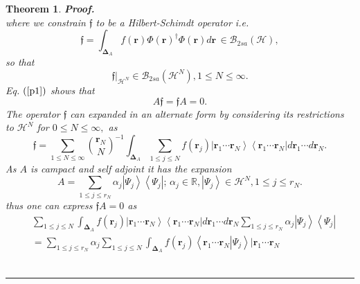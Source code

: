 \documentclass[aps,preprint]{revtex4}%
\newtheorem{theorem}{Theorem}
\newenvironment{proof}[1][Proof]{\noindent\textbf{#1.} }{\ \rule{0.5em}{0.5em}}
\begin{document}
\begin{theorem}
\begin{proof}
\begin{equation}
\end{equation}
where we constrain $\mathfrak{f}$ to be a Hilbert-Schimdt operator i.e.
\begin{equation}
\mathfrak{f}=\int_{\boldsymbol{\Delta}_{A}}f\left(  \boldsymbol{r}\right)
\Phi\left(  \boldsymbol{r}\right)  ^{\dagger}\Phi\left(  \boldsymbol{r}%
\right)  d\boldsymbol{r\,}\in\mathcal{B}_{2sa}\left(  \mathcal{H}\right)  ,
\end{equation}
so that%
\begin{equation}
\left.  \mathfrak{f}\right\vert _{\mathcal{H}^{N}}\in\mathcal{B}_{2sa}\left(
\mathcal{H}^{N}\right)  ,1\leq N\leq\infty.
\end{equation}
Eq. $\left(  \ref{p1}\right)  $ shows that
\begin{equation}
A\mathfrak{f}=\mathfrak{f}A=0.
\end{equation}
The operator $\mathfrak{f}$ can expanded in an alternate form by considering
its restrictions to $\mathcal{H}^{N}$ for $0\leq N\leq\infty,$ as
\begin{equation}
\mathfrak{f}=\sum_{1\leq N\leq\infty}\binom{\boldsymbol{r}_{N}}{N}^{-1}%
\int_{\boldsymbol{\Delta}_{A}}\sum_{1\leq j\leq N}f\left(  \boldsymbol{r}%
_{j}\right)  \left\vert \boldsymbol{r}_{1}\cdots\boldsymbol{r}_{N}%
\right\rangle \left\langle \boldsymbol{r}_{1}\cdots\boldsymbol{r}%
_{N}\right\vert d\boldsymbol{r}_{1}\cdots d\boldsymbol{r}_{N}.
\end{equation}
As $A$ is campact and self adjoint it has the expansion
\begin{equation}
A=\sum_{1\leq j\leq r_{N}}\alpha_{j}\left\vert \Psi_{j}\right\rangle
\left\langle \Psi_{j}\right\vert ;\,\alpha_{j}\in\mathbb{R},\left\vert
\Psi_{j}\right\rangle \in\mathcal{H}^{N},1\leq j\leq r_{N}.
\end{equation}
thus one can express $\mathfrak{f}A=0$ as
\begin{align}
&  \sum_{1\leq j\leq N}\int_{\boldsymbol{\Delta}_{A}}f\left(  \boldsymbol{r}%
_{j}\right)  \left\vert \boldsymbol{r}_{1}\cdots\boldsymbol{r}_{N}%
\right\rangle \left\langle \boldsymbol{r}_{1}\cdots\boldsymbol{r}%
_{N}\right\vert d\boldsymbol{r}_{1}\cdots d\boldsymbol{r}_{N}\sum_{1\leq j\leq
r_{N}}\alpha_{j}\left\vert \Psi_{j}\right\rangle \left\langle \Psi
_{j}\right\vert \nonumber\\
&  =\sum_{1\leq j\leq r_{N}}\alpha_{j}\sum_{1\leq j\leq N}\int%
_{\boldsymbol{\Delta}_{A}}f\left(  \boldsymbol{r}_{j}\right)  \left\langle
\boldsymbol{r}_{1}\cdots\boldsymbol{r}_{N}\left\vert \Psi_{j}\right.
\right\rangle \left\vert \boldsymbol{r}_{1}\cdots\boldsymbol{r}_{N}%

\end{align}
\end{proof}
\end{theorem}
\end{document}
